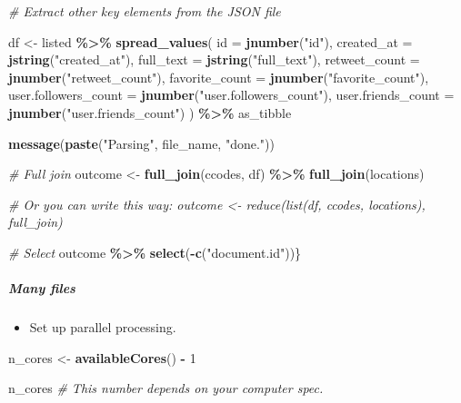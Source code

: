 \documentclass[
]{book}
\newenvironment{Shaded}{\begin{snugshade}}{\end{snugshade}}
\newcommand{\CommentTok}[1]{\textcolor[rgb]{0.56,0.35,0.01}{\textit{#1}}}
\newcommand{\DataTypeTok}[1]{\textcolor[rgb]{0.13,0.29,0.53}{#1}}
\newcommand{\DecValTok}[1]{\textcolor[rgb]{0.00,0.00,0.81}{#1}}
\newcommand{\KeywordTok}[1]{\textcolor[rgb]{0.13,0.29,0.53}{\textbf{#1}}}
\newcommand{\NormalTok}[1]{#1}
\newcommand{\OperatorTok}[1]{\textcolor[rgb]{0.81,0.36,0.00}{\textbf{#1}}}
\newcommand{\StringTok}[1]{\textcolor[rgb]{0.31,0.60,0.02}{#1}}
\providecommand{\tightlist}{%
  \setlength{\itemsep}{0pt}\setlength{\parskip}{0pt}}
\begin{document}
\begin{Shaded}
\begin{Highlighting}[]
\CommentTok{\# Extract other key elements from the JSON file}

\NormalTok{df \textless{}{-}}\StringTok{ }\NormalTok{listed }\OperatorTok{\%\textgreater{}\%}
\StringTok{  }\KeywordTok{spread\_values}\NormalTok{(}
    \DataTypeTok{id =} \KeywordTok{jnumber}\NormalTok{(}\StringTok{"id"}\NormalTok{),}
    \DataTypeTok{created\_at =} \KeywordTok{jstring}\NormalTok{(}\StringTok{"created\_at"}\NormalTok{),}
    \DataTypeTok{full\_text =} \KeywordTok{jstring}\NormalTok{(}\StringTok{"full\_text"}\NormalTok{),}
    \DataTypeTok{retweet\_count =} \KeywordTok{jnumber}\NormalTok{(}\StringTok{"retweet\_count"}\NormalTok{),}
    \DataTypeTok{favorite\_count =} \KeywordTok{jnumber}\NormalTok{(}\StringTok{"favorite\_count"}\NormalTok{),}
    \DataTypeTok{user.followers\_count =} \KeywordTok{jnumber}\NormalTok{(}\StringTok{"user.followers\_count"}\NormalTok{),}
    \DataTypeTok{user.friends\_count =} \KeywordTok{jnumber}\NormalTok{(}\StringTok{"user.friends\_count"}\NormalTok{)}
\NormalTok{  ) }\OperatorTok{\%\textgreater{}\%}
\StringTok{      }\NormalTok{as\_tibble}

\KeywordTok{message}\NormalTok{(}\KeywordTok{paste}\NormalTok{(}\StringTok{"Parsing"}\NormalTok{, file\_name, }\StringTok{"done."}\NormalTok{))}

\CommentTok{\# Full join}
\NormalTok{outcome \textless{}{-}}\StringTok{ }\KeywordTok{full\_join}\NormalTok{(ccodes, df) }\OperatorTok{\%\textgreater{}\%}\StringTok{ }\KeywordTok{full\_join}\NormalTok{(locations)}

\CommentTok{\# Or you can write this way: outcome \textless{}{-} reduce(list(df, ccodes, locations), full\_join)}

\CommentTok{\# Select}
\NormalTok{outcome }\OperatorTok{\%\textgreater{}\%}\StringTok{ }\KeywordTok{select}\NormalTok{(}\OperatorTok{{-}}\KeywordTok{c}\NormalTok{(}\StringTok{"document.id"}\NormalTok{))\}}
\end{Highlighting}
\end{Shaded}

\hypertarget{many-files}{%
\subparagraph{Many files}\label{many-files}}

\begin{itemize}
\tightlist
\item
  Set up parallel processing.
\end{itemize}

\begin{Shaded}
\begin{Highlighting}[]
\NormalTok{n\_cores \textless{}{-}}\StringTok{ }\KeywordTok{availableCores}\NormalTok{() }\OperatorTok{{-}}\StringTok{ }\DecValTok{1}

\NormalTok{n\_cores }\CommentTok{\# This number depends on your computer spec.}
\end{Highlighting}
\end{Shaded}
\end{document}
